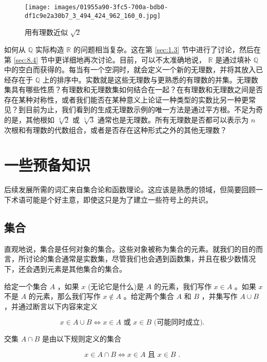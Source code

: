 \begin{figure}[h]
  \centering
  \texttt{[image: images/01955a90-3fc5-700a-bdb0-df1c9e2a30b7\_3\_494\_424\_962\_160\_0.jpg]}
  \caption{用有理数近似 \(\sqrt{2}\) }
  \label{fig:1.2}
\end{figure}


如何从 \(\mathbb{Q}\) 实际构造 \(\mathbb{R}\) 的问题相当复杂。这在第 \ref{sec:1.3} 节中进行了讨论，然后在第 \ref{sec:8.4} 节中更详细地再次讨论。目前，可以不太准确地说， \(\mathbb{R}\) 是通过填补 \(\mathbb{Q}\) 中的空白而获得的。每当有一个空洞时，就会定义一个新的无理数，并将其放入已经存在于 \(\mathbb{Q}\) 上的排序中。实数就是这些无理数与更熟悉的有理数的并集。无理数集具有哪些性质？有理数和无理数集如何结合在一起？在有理数和无理数之间是否存在某种对称性，或者我们能否在某种意义上论证一种类型的实数比另一种更常见？到目前为止，我们看到的生成无理数示例的唯一方法是通过平方根。不足为奇的是，其他根如 \(\sqrt[3]{2}\) 或 \(\sqrt[5]{3}\) 通常也是无理数。所有无理数是否都可以表示为 \(n\) 次根和有理数的代数组合，或者是否存在这种形式之外的其他无理数？

\section{一些预备知识}
\label{sec:1.2}

后续发展所需的词汇来自集合论和函数理论。这应该是熟悉的领域，但简要回顾一下术语可能是个好主意，即使这只是为了建立一些符号上的共识。

\subsection{集合}

直观地说，集合是任何对象的集合。这些对象被称为集合的元素。就我们的目的而言，所讨论的集合通常是实数集，尽管我们也会遇到函数集，并且在极少数情况下，还会遇到元素是其他集合的集合。

给定一个集合 \(A\) ，如果 \(x\) (无论它是什么)是 \(A\) 的元素，我们写作 \(x \in  A\) 。如果 \(x\) 不是 \(A\) 的元素，那么我们写作 \(x \notin  A\) 。给定两个集合 \(A\) 和 \(B\) ，并集写作 \(A \cup  B\) ，并通过断言以下内容来定义

\[
x \in  A \cup  B \Leftrightarrow x \in  A\text{ 或 }x \in  B\text{ (可能同时成立). }
\]

交集 \(A \cap  B\) 是由以下规则定义的集合

\[
x \in  A \cap  B \Leftrightarrow x \in  A\text{ 且 }x \in  B\text{ . }
\]


